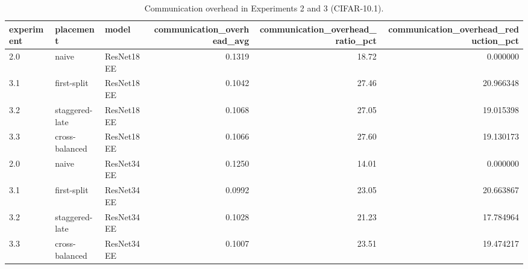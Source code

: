 \begin{table}
\centering
\caption{Communication overhead in Experiments 2 and 3 (CIFAR-10.1).}
\label{tab:exp2-exp3-communication-overhead-cifar10-1}
\begin{tabular}{lllrrr}
\toprule
experiment &      placement &      model &  communication\_overhead\_avg &  communication\_overhead\_ratio\_pct &  communication\_overhead\_reduction\_pct \\
\midrule
       2.0 &          naive & ResNet18EE &                      0.1319 &                             18.72 &                              0.000000 \\
       3.1 &    first-split & ResNet18EE &                      0.1042 &                             27.46 &                             20.966348 \\
       3.2 & staggered-late & ResNet18EE &                      0.1068 &                             27.05 &                             19.015398 \\
       3.3 & cross-balanced & ResNet18EE &                      0.1066 &                             27.60 &                             19.130173 \\
       2.0 &          naive & ResNet34EE &                      0.1250 &                             14.01 &                              0.000000 \\
       3.1 &    first-split & ResNet34EE &                      0.0992 &                             23.05 &                             20.663867 \\
       3.2 & staggered-late & ResNet34EE &                      0.1028 &                             21.23 &                             17.784964 \\
       3.3 & cross-balanced & ResNet34EE &                      0.1007 &                             23.51 &                             19.474217 \\
\bottomrule
\end{tabular}
\end{table}
